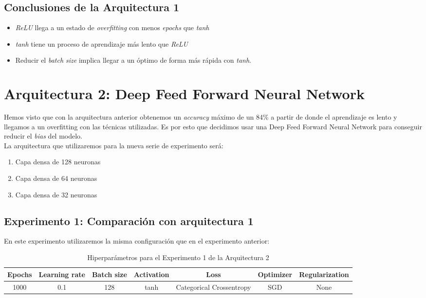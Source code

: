 \documentclass{article}
\begin{document}
		\subsection{Conclusiones de la Arquitectura 1}
			\begin{itemize}
				\item \textit{ReLU} llega a un estado de \textit{overfitting} con menos \textit{epochs} que \textit{tanh}
				\item \textit{tanh} tiene un proceso de aprendizaje m\'as lento que \textit{ReLU}
				\item Reducir el \textit{batch size} implica llegar a un \'optimo de forma m\'as r\'apida con \textit{tanh}.
			\end{itemize}
			
	\section{Arquitectura 2: Deep Feed Forward Neural Network}
		Hemos visto que con la arquitectura anterior obtenemos un \textit{accuracy} m\'aximo de un 84\% a partir de donde el aprendizaje es lento y llegamos a un overfitting con las t\'ecnicas utilizadas. Es por esto que decidimos usar una Deep Feed Forward Neural Network para conseguir reducir el \textit{bias} del modelo.\\
		La arquitectura que utilizaremos para la nueva serie de experimento ser\'a:
		
		\begin{enumerate}
			\item Capa densa de 128 neuronas
			\item Capa densa de 64 neuronas
			\item Capa densa de 32 neuronas
		\end{enumerate}
		
		\subsection{Experimento 1: Comparaci\'on con arquitectura 1}
		\label{s-a2-e1}
			En este experimento utilizaremos la misma configuraci\'on que en el experimento anterior:
			\begin{table}[!h]
				\begin{center}
					\begin{tabular}{| c | c | c | c | c | c | c |}
						\textbf{Epochs} & \textbf{Learning rate} & \textbf{Batch size} & \textbf{Activation} & \textbf{Loss} & \textbf{Optimizer} & \textbf{Regularization} \\ \hline
						1000 & 0.1 & 128 & tanh & Categorical Crossentropy & SGD & None
					\end{tabular}
					\caption{Hiperpar\'ametros para el Experimento 1 de la Arquitectura 2}
					\label{tab:hip-a2-e1}
				\end{center}
			\end{table}
			
\end{document}
